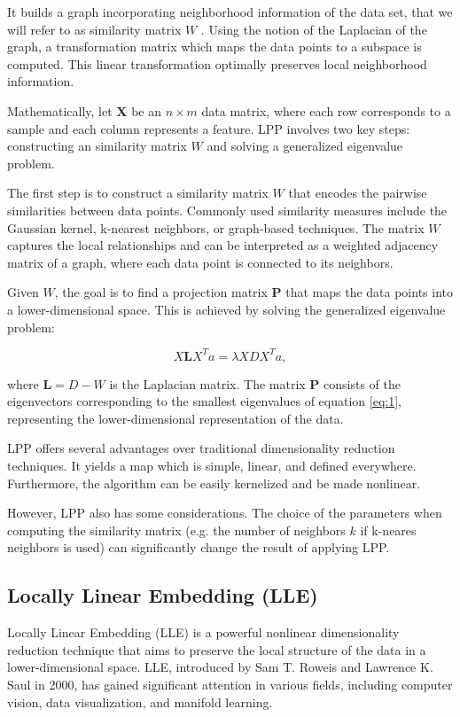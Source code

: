 It builds a graph incorporating neighborhood information
of the data set, that we will refer to as similarity matrix $W$ . Using the notion of the Laplacian of the graph, a transformation matrix which maps the data points to a subspace is computed. This linear transformation optimally preserves local neighborhood information.

Mathematically, let $\mathbf{X}$ be an $n \times m$ data matrix, where each row corresponds to a sample and each column represents a feature. LPP involves two key steps: constructing an similarity matrix $W$ and solving a generalized eigenvalue problem.

The first step is to construct a similarity matrix $W$ that encodes the pairwise similarities between data points. Commonly used similarity measures include the Gaussian kernel, k-nearest neighbors, or graph-based techniques. The matrix $W$ captures the local relationships and can be interpreted as a weighted adjacency matrix of a graph, where each data point is connected to its neighbors.

Given $W$, the goal is to find a projection matrix $\mathbf{P}$ that maps the data points into a lower-dimensional space. This is achieved by solving the generalized eigenvalue problem:

\begin{equation} \label{eq:1}
    X \mathbf{L} X^T a = \lambda XDX^Ta,
\end{equation}

where $\mathbf{L} = D-W$ is the Laplacian matrix. The matrix $\mathbf{P}$ consists of the eigenvectors corresponding to the smallest eigenvalues of equation \ref{eq:1}, representing the lower-dimensional representation of the data.

LPP offers several advantages over traditional dimensionality reduction techniques. It yields a map which is simple, linear, and defined everywhere. Furthermore, the algorithm can be easily kernelized and be made nonlinear.

However, LPP also has some considerations. The choice of the parameters when computing the similarity matrix (e.g. the number of neighbors $k$ if k-neares neighbors is used) can significantly change the result of applying LPP.

\subsection{Locally Linear Embedding (LLE)} %

Locally Linear Embedding (LLE) \cite{lle} is a powerful nonlinear dimensionality reduction technique that aims to preserve the local structure of the data in a lower-dimensional space. LLE, introduced by Sam T. Roweis and Lawrence K. Saul in 2000, has gained significant attention in various fields, including computer vision, data visualization, and manifold learning.

